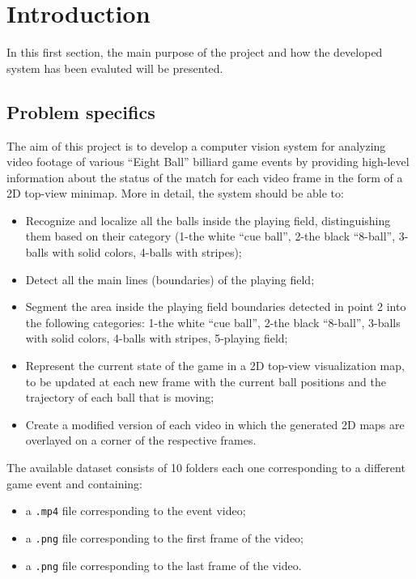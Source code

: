 \section{Introduction}

In this first section, the main purpose of the project and how the developed system has been evaluted will be presented.


\subsection{Problem specifics}
The aim of this project is to develop a computer vision system for analyzing video footage of various “Eight Ball”
billiard game events by providing high-level information about the status of the match for each video frame in the form of a 
2D top-view minimap.
\newline
More in detail, the system should be able to:
\begin{itemize}
    \item Recognize and localize all the balls inside the playing field, distinguishing them based on their category (1-the
    white “cue ball”, 2-the black “8-ball”, 3-balls with solid colors, 4-balls with stripes);
    \item Detect all the main lines (boundaries) of the playing field;
    \item Segment the area inside the playing field boundaries detected in point 2 into the following categories: 1-the
    white “cue ball”, 2-the black “8-ball”, 3-balls with solid colors, 4-balls with stripes, 5-playing field;
    \item Represent the current state of the game in a 2D top-view visualization map, to be updated at each new frame
    with the current ball positions and the trajectory of each ball that is moving;
    \item Create a modified version of each video in which the generated 2D maps are 
    overlayed on a corner of the respective frames.
\end{itemize}

\noindent
The available dataset consists of 10 folders each one corresponding to a different game event and containing:
\begin{itemize}
    \item a \verb|.mp4| file corresponding to the event video;
    \item a \verb|.png| file corresponding to the first frame of the video;
    \item a \verb|.png| file corresponding to the last frame of the video.
\end{itemize}

